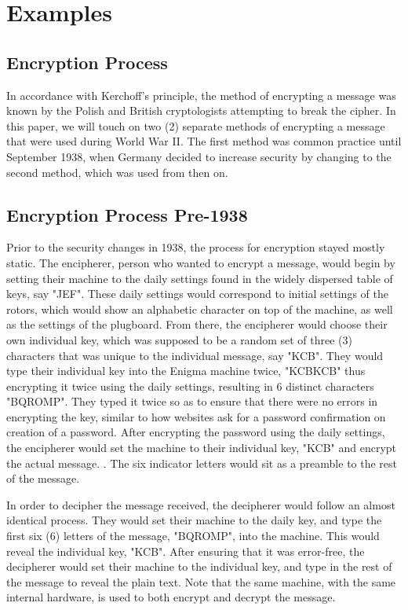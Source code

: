 \chapter{Examples}\label{chap:examples}

\section{Encryption Process}

In accordance with Kerchoff's principle, the method of encrypting a message was known by the Polish and British cryptologists attempting to break the cipher. In this paper, we will touch on two (2) separate methods of encrypting a message that were used during World War II. The first method was common practice until September 1938, when Germany decided to increase security by changing to the second method, which was used from then on.

\section{Encryption Process Pre-1938}\label{sec:encprocess1938}

Prior to the security changes in 1938, the process for encryption stayed mostly static. The encipherer, person who wanted to encrypt a message, would begin by setting their machine to the daily settings found in the widely dispersed table of keys, say "JEF". These daily settings would correspond to initial settings of the rotors, which would show an alphabetic character on top of the machine, as well as the settings of the plugboard. From there, the encipherer would choose their own individual key, which was supposed to be a random set of three (3) characters that was unique to the individual message, say "KCB". They would type their individual key into the Enigma machine twice, "KCBKCB" thus encrypting it twice using the daily settings, resulting in 6 distinct characters "BQROMP". They typed it twice so as to ensure that there were no errors in encrypting the key, similar to how websites ask for a password confirmation on creation of a password. After encrypting the password using the daily settings, the encipherer would set the machine to their individual key, "KCB" and encrypt the actual message. \cite{wt06}. The six indicator letters would sit as a preamble to the rest of the message.

In order to decipher the message received, the decipherer would follow an almost identical process. They would set their machine to the daily key, and type the first six (6) letters of the message, "BQROMP", into the machine. This would reveal the individual key, "KCB". After ensuring that it was error-free, the decipherer would set their machine to the individual key, and type in the rest of the message to reveal the plain text. Note that the same machine, with the same internal hardware, is used to both encrypt and decrypt the message.

